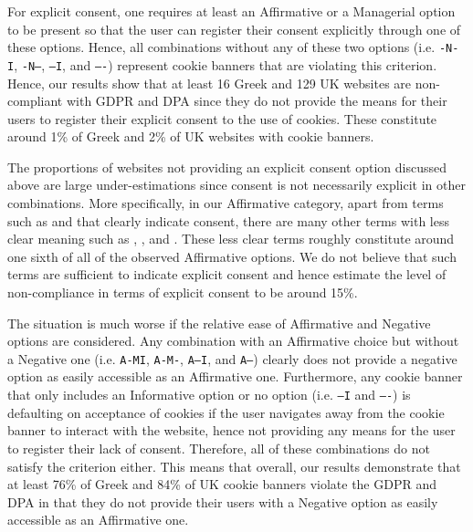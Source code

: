 For explicit consent, one requires at least an Affirmative or a Managerial option to be present so that the user can register their consent explicitly through one of these options. Hence, all combinations without any of these two options (i.e. \texttt{-N-I}, \texttt{-N--}, \texttt{---I}, and \texttt{----}) represent cookie banners that are violating this criterion. Hence, our results show that at least 16 Greek and 129 UK websites are non-compliant with GDPR and DPA since they do not provide the means for their users to register their explicit consent to the use of cookies. These constitute around 1\% of Greek and 2\% of UK websites with cookie banners. 

The proportions of websites not providing an explicit consent option discussed above are large under-estimations since consent is not necessarily explicit in other combinations. More specifically, in our Affirmative category, apart from terms such as  and  that clearly indicate consent, there are many other terms with less clear meaning such as , , and . These less clear terms roughly constitute around one sixth of all of the observed Affirmative options. We do not believe that such terms are sufficient to indicate explicit consent and hence estimate the level of non-compliance in terms of explicit consent to be around 15\%. 

The situation is much worse if the relative ease of Affirmative and Negative options are considered. Any combination with an Affirmative choice but without a Negative one (i.e. \texttt{A-MI}, \texttt{A-M-}, \texttt{A--I}, and \texttt{A---}) clearly does not provide a negative option as easily accessible as an Affirmative one. Furthermore, any cookie banner that only includes an Informative option or no option (i.e. \texttt{---I} and \texttt{----}) is defaulting on acceptance of cookies if the user navigates away from the cookie banner to interact with the website, hence not providing any means for the user to register their lack of consent. Therefore, all of these combinations do not satisfy the criterion either. This means that overall, our results demonstrate that at least 76\% of Greek and 84\% of UK cookie banners violate the GDPR and DPA in that they do not provide their users with a Negative option as easily accessible as an Affirmative one. 

